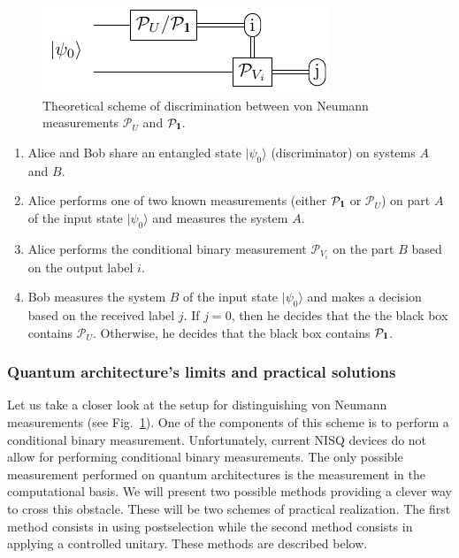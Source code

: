 \documentclass[preprint,12pt, a4paper]{elsarticle}
\newcommand{\ket}[1]{\ensuremath{|#1\rangle}}
\newcommand{\1}{{\rm 1\hspace{-0.9mm}l}}
\newcommand{\Id}{{\rm 1\hspace{-0.9mm}l}}
\newcommand{\PP}{\mathcal{P}}
\begin{document}
\begin{figure}[h!]
	\centering
	\includegraphics[scale=1.7]{pics/theoretical_scheme}
	\caption{Theoretical  scheme of discrimination  between von Neumann measurements $\PP_{U}$ and $\PP_\Id$. }
	\label{fig:theoretical_scheme}
\end{figure}



\begin{enumerate}
	\item Alice and Bob share an entangled state $\ket{\psi_{0}}$ (discriminator) on systems 
	$A$ and $B$.
	\item Alice performs one of two known measurements (either $\PP_{\Id}$ or 
	$\PP_{U}$) on part $A$ of the input state  $\ket{\psi_{0}}$ and measures the system $A$.
	\item Alice performs the conditional binary measurement $\PP_{V_i}$ on the part 
	$B$ based on the output label $i$. 
	\item  Bob measures the system $B$ of the input state  $\ket{\psi_{0}}$ and 
	makes a decision based on the received label $j$. If $j=0$, then he decides 
	that the the black box contains $\PP_U$. Otherwise, he decides that the 
	black box contains $\PP_{\Id}$. 
\end{enumerate}  



\subsubsection{Quantum architecture's limits and practical solutions}



Let us take a closer look at the setup for distinguishing von Neumann 
measurements (see Fig.~\ref{fig:theoretical_scheme}). One of the components of 
this scheme is to perform a conditional binary measurement. 
Unfortunately, current NISQ devices do not allow for performing conditional 
binary measurements.
The only possible measurement performed on quantum architectures is the 
measurement in the computational basis. 
We  will present two possible methods providing a clever way to cross this 
obstacle. These will be two schemes of practical realization. 
The first method consists in using postselection while the second method 
consists in applying a controlled unitary. These methods are described below. 
\end{document}
